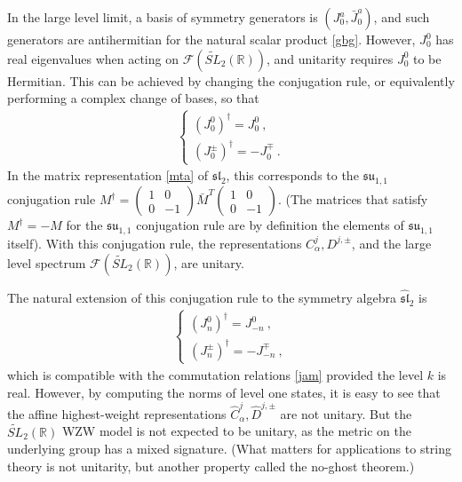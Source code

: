 \documentclass[12pt, a4paper, notitlepage, twoside]{report}
\numberwithin{equation}{section}
\theoremstyle{break}
\begin{document}
In the large level limit, a basis of symmetry generators is $(J^a_0,\bar J^a_0)$, and such generators are antihermitian for the natural scalar product \eqref{gbg}.
However, $J^0_0$ has real eigenvalues when acting on $\mathcal{F}(\widetilde{SL}_2(\mathbb{R}))$, and unitarity requires $J^0_0$ to be Hermitian. 
This can be achieved by changing the conjugation rule, or equivalently performing a complex change of bases, so that 
\begin{align}
 \left\{\begin{array}{l} (J_0^0)^\dagger = J_0^0\ , \\
         (J_0^\pm)^\dagger = -J_0^\mp \ .
        \end{array}
\right.
\label{jtdj}
\end{align}
In the matrix representation \eqref{mta} of $\mathfrak{sl}_2$, this corresponds to the $\mathfrak{su}_{1,1}$ conjugation rule $M^\dagger = \left(\begin{smallmatrix} 1 & 0 \\ 0 & -1 \end{smallmatrix}\right) \bar{M}^T \left(\begin{smallmatrix} 1 & 0 \\ 0 & -1 \end{smallmatrix}\right)$. (The matrices that satisfy $M^\dagger =-M$ for the $\mathfrak{su}_{1,1}$ conjugation rule are by definition the elements of $\mathfrak{su}_{1,1}$ itself). With this conjugation rule, the representations $C^j_\alpha,D^{j,\pm}$, and the large level spectrum $\mathcal{F}(\widetilde{SL}_2(\mathbb{R}))$, are unitary.

The natural extension of this conjugation rule to the symmetry algebra $\widehat{\mathfrak{sl}}_2$ is
\begin{align}
 \left\{\begin{array}{l} (J_n^0)^\dagger = J_{-n}^0\ , \\
         (J_n^\pm)^\dagger = -J_{-n}^\mp \ ,
        \end{array}
\right.
\end{align}
which is compatible with the commutation relations \eqref{jam} provided the level $k$ is real.
However, by computing the norms of level one states, it is easy to see that the affine highest-weight representations $\hat{C}^j_\alpha, \hat{D}^{j,\pm}$  are not unitary.
But the $\widetilde{SL}_2(\mathbb{R})$ WZW model is not expected to be unitary, as the metric on the underlying group has a mixed signature. (What matters for applications to string theory is not unitarity, but another property called the no-ghost theorem.) 
\end{document}
